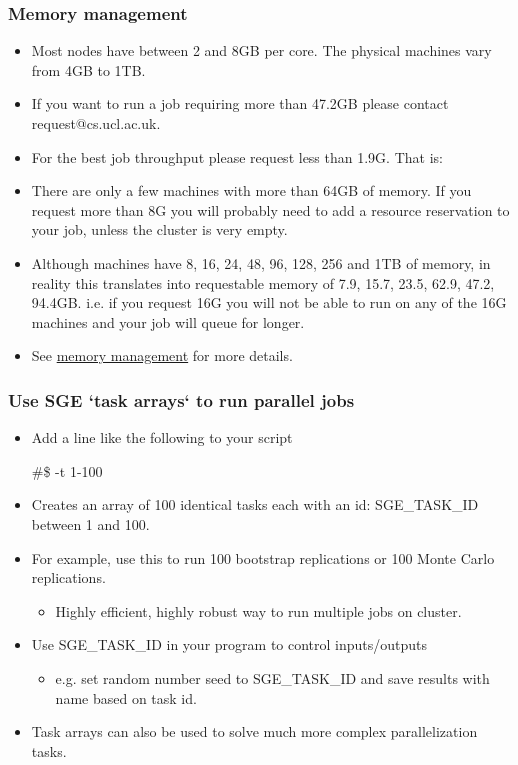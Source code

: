 \documentclass{beamer}
\begin{document}
\begin{frame}
\frametitle{Memory management}
\begin{itemize}
\item Most nodes have between 2 and 8GB per core.  The physical machines vary from 4GB to 1TB.
\item If you want to run a job requiring more than 47.2GB please contact request@cs.ucl.ac.uk.
\item For the best job throughput please request less than 1.9G. That is:
\item There are only a few machines with more than 64GB of memory. If you request more than 8G you will probably need to add a resource reservation to your job, unless the cluster is very empty.
\item Although machines have 8, 16, 24, 48, 96, 128, 256 and 1TB of memory, in reality this translates into requestable memory of 7.9, 15.7, 23.5, 62.9, 47.2, 94.4GB. i.e. if you request 16G you will not be able to run on any of the 16G machines and your job will queue for longer.
\item See \textcolor{blue}{ \href{http://hpc.cs.ucl.ac.uk/memory\_managment}{memory management}} for more details.
\end{itemize}
\end{frame}


\begin{frame}
\frametitle{Use SGE `task arrays` to run parallel jobs}
\begin{itemize}
\item Add a line like the following to your script
\begin{semiverbatim}
\#\$ -t 1-100
\end{semiverbatim}
\item Creates an array of 100 identical tasks each with an  id: SGE\_TASK\_ID between 1 and 100.
\item For example, use this to run 100 bootstrap replications or 100 Monte Carlo replications.
\begin{itemize}
\item Highly efficient, highly robust way to run multiple jobs on cluster.
\end{itemize}
\item Use SGE\_TASK\_ID in your program to control inputs/outputs
\begin{itemize}
\item e.g. set random number seed to SGE\_TASK\_ID and save results with name based on task id.
\end{itemize}
\item Task arrays can also be used to solve much more complex parallelization tasks.
\end{itemize}
\end{frame}
\end{document}
